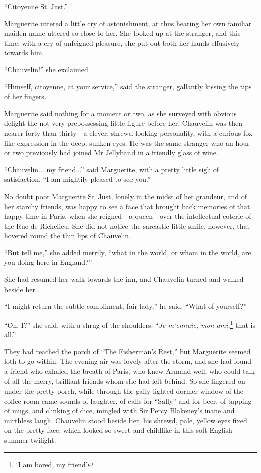 \enquote{Citoyenne St~Just.}

Marguerite uttered a little cry of astonishment, at thus hearing her own familiar maiden name uttered so close to her. She looked up at the stranger, and this time, with a cry of unfeigned pleasure, she put out both her hands effusively towards him.

\enquote{Chauvelin!} she exclaimed.

\enquote{Himself, citoyenne, at your service,} said the stranger, gallantly kissing the tips of her fingers.

Marguerite said nothing for a moment or two, as she surveyed with obvious delight the not very prepossessing little figure before her. Chauvelin was then nearer forty than thirty---a clever, shrewd-looking personality, with a curious fox-like expression in the deep, sunken eyes. He was the same stranger who an hour or two previously had joined Mr Jellyband in a friendly glass of wine.

\enquote{Chauvelin... my friend...} said Marguerite, with a pretty little sigh of satisfaction. \enquote{I am mightily pleased to see you.}

No doubt poor Marguerite St~Just, lonely in the midst of her grandeur, and of her starchy friends, was happy to see a face that brought back memories of that happy time in Paris, when she reigned---a queen---over the intellectual coterie of the Rue de Richelieu. She did not notice the sarcastic little smile, however, that hovered round the thin lips of Chauvelin.

\enquote{But tell me,} she added merrily, \enquote{what in the world, or whom in the world, are you doing here in England?}

She had resumed her walk towards the inn, and Chauvelin turned and walked beside her.

\enquote{I might return the subtle compliment, fair lady,} he said. \enquote{What of yourself?}

\enquote{Oh, I?} she said, with a shrug of the shoulders. \enquote{\textit{Je m'ennuie, mon ami,}\footnote{\enquote{I am bored, my friend}} that is all.}

They had reached the porch of \enquote{The Fisherman's Rest,} but Marguerite seemed loth to go within. The evening air was lovely after the storm, and she had found a friend who exhaled the breath of Paris, who knew Armand well, who could talk of all the merry, brilliant friends whom she had left behind. So she lingered on under the pretty porch, while through the gaily-lighted dormer-window of the coffee-room came sounds of laughter, of calls for \enquote{Sally} and for beer, of tapping of mugs, and clinking of dice, mingled with Sir Percy Blakeney's inane and mirthless laugh. Chauvelin stood beside her, his shrewd, pale, yellow eyes fixed on the pretty face, which looked so sweet and childlike in this soft English summer twilight.

